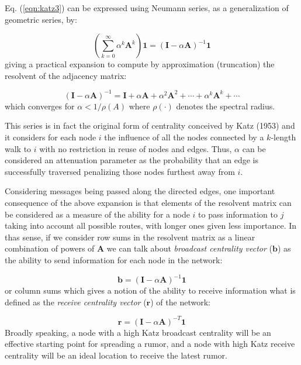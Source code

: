 Eq. (\ref{eqn:katz3}) can be expressed using Neumann series, as a generalization of geometric series, by: 

\begin{equation}
\label{eqn:katz4}
    \left(\sum_{k=0}^{\infty}\alpha^k \mathbf{A}^k\right)\mathbf{1} = (\mathbf{I}-\alpha\mathbf{A})^{-1}\mathbf{1}
\end{equation}
giving a practical expansion to compute by approximation (truncation) the resolvent of the adjacency matrix:

\begin{equation}
\label{eqn:katz5}
    (\mathbf{I}-\alpha\mathbf{A})^{-1} = \mathbf{I} + \alpha\mathbf{A} + \alpha^2\mathbf{A}^2 + \cdots + \alpha^k\mathbf{A}^k + \cdots
\end{equation}
which converges for $\alpha<1/\rho(A)$ where $\rho(\cdot)$ denotes the spectral radius. 

This series is in fact the original form of centrality conceived by Katz (1953) and it considers for each node $i$ the influence of all the nodes connected by a $k$-length walk to $i$ with no restriction in reuse of nodes and edges. Thus, $\alpha$ can be considered an attenuation parameter as the probability that an edge is successfully traversed penalizing those nodes furthest away from $i$. 

Considering messages being passed along the directed edges, one important consequence of the above expansion is that elements of the resolvent matrix can be considered as a measure of the ability for a node $i$ to pass information to $j$ taking into account all possible routes, with longer ones given less importance. In thas sense, if we consider row sums in the resolvent matrix as a linear combination of powers of $\mathbf{A}$ we can talk about \textit{broadcast centrality vector} ($\mathbf{b}$) as the ability to send information for each node in the network:  

\begin{equation}
\label{eqn:broad}
    \mathbf{b}=(\mathbf{I}-\alpha\mathbf{A})^{-1} \mathbf{1}
\end{equation}
or column sums which gives a notion of the ability to receive information what is defined as the \textit{receive centrality vector} ($\mathbf{r}$) of the network:

\begin{equation}
\label{eqn:receiv}
    \mathbf{r} = (\mathbf{I}-\alpha\mathbf{A})^{-T} \mathbf{1}
\end{equation}
Broadly speaking, a node with a high Katz broadcast centrality will be an effective starting point for spreading a rumor, and a node with high Katz receive centrality will be an ideal location to receive the latest rumor.

